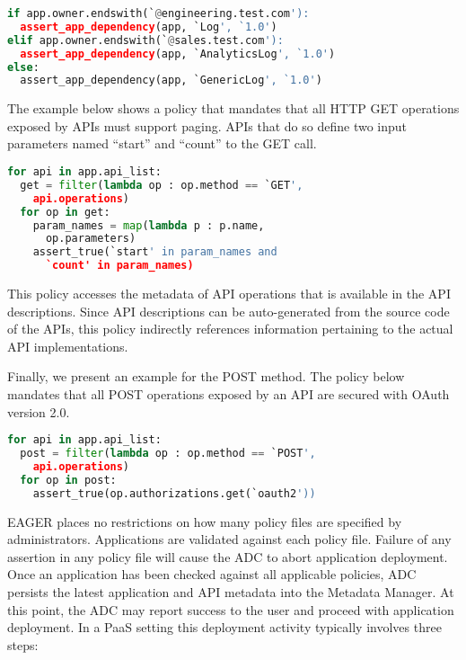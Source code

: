 \vspace{0.05in}
{\footnotesize
\begin{lstlisting}[language=Python, frame=single, showstringspaces=false]
if app.owner.endswith(`@engineering.test.com'):
  assert_app_dependency(app, `Log', `1.0')
elif app.owner.endswith(`@sales.test.com'):
  assert_app_dependency(app, `AnalyticsLog', `1.0')
else:
  assert_app_dependency(app, `GenericLog', `1.0')
\end{lstlisting}
}
\vspace{0.05in} 

The example below shows a policy that mandates 
that all HTTP GET operations exposed by APIs must support
paging. APIs that do so define two input parameters 
named ``start'' and ``count'' to the GET call.

\vspace{0.05in}
{\footnotesize
\begin{lstlisting}[language=Python, frame=single, showstringspaces=false]
for api in app.api_list:
  get = filter(lambda op : op.method == `GET',  
    api.operations)
  for op in get:
    param_names = map(lambda p : p.name, 
      op.parameters)
    assert_true(`start' in param_names and 
      `count' in param_names)
\end{lstlisting}
}
\vspace{0.05in}

This policy accesses the metadata of API operations that 
is available in the API descriptions.
Since API descriptions can be auto-generated 
from the source code of the APIs, this policy indirectly
references information pertaining to the actual API implementations.

Finally, we present an example for the POST method.  The 
policy below mandates 
that all POST operations exposed by an API are secured 
with OAuth version 2.0.

\vspace{0.05in}
{\footnotesize
\begin{lstlisting}[language=Python, frame=single, showstringspaces=false]
for api in app.api_list:
  post = filter(lambda op : op.method == `POST', 
  	api.operations)
  for op in post:
    assert_true(op.authorizations.get(`oauth2'))
\end{lstlisting}
}
\vspace{0.05in}

EAGER places no restrictions on how many policy files are specified by 
administrators. Applications are validated against each policy file. Failure
of any assertion in any policy file will cause the ADC to abort 
application deployment. Once an application has been checked against all
applicable policies, ADC persists the latest application and API metadata into
the Metadata Manager.  At this point, the ADC may report success to the user
and proceed with application deployment. In a PaaS setting
this deployment activity typically involves three steps:

